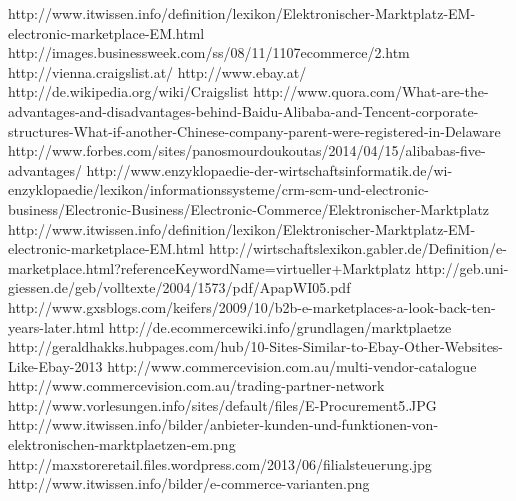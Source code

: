 \documentclass[11pt,a4paper]{article}
\begin{document}
\newpage
\begin{thebibliography}{1}
	
	 http://www.itwissen.info/definition/lexikon/Elektronischer-Marktplatz-EM-electronic-marketplace-EM.html
	 http://images.businessweek.com/ss/08/11/1107\textunderscore ecommerce/2.htm
	 http://vienna.craigslist.at/
	 http://www.ebay.at/
	 http://de.wikipedia.org/wiki/Craigslist
	 http://www.quora.com/What-are-the-advantages-and-disadvantages-behind-Baidu-Alibaba-and-Tencent-corporate-structures-What-if-another-Chinese-company-parent-were-registered-in-Delaware
	 http://www.forbes.com/sites/panosmourdoukoutas/2014/04/15/alibabas-five-advantages/
	 http://www.enzyklopaedie-der-wirtschaftsinformatik.de/wi-enzyklopaedie/lexikon/informationssysteme/crm-scm-und-electronic-business/Electronic-Business/Electronic-Commerce/Elektronischer-Marktplatz
	 http://www.itwissen.info/definition/lexikon/Elektronischer-Marktplatz-EM-electronic-marketplace-EM.html
	 http://wirtschaftslexikon.gabler.de/Definition/e-marketplace.html?referenceKeywordName=virtueller+Marktplatz
	 http://geb.uni-giessen.de/geb/volltexte/2004/1573/pdf/Apap\textunderscore WI\textunderscore 05.pdf
	 http://www.gxsblogs.com/keifers/2009/10/b2b-e-marketplaces-a-look-back-ten-years-later.html
	 http://de.ecommercewiki.info/grundlagen/marktplaetze
	 http://geraldhakks.hubpages.com/hub/10-Sites-Similar-to-Ebay-Other-Websites-Like-Ebay-2013
	 http://www.commercevision.com.au/multi-vendor-catalogue
	 http://www.commercevision.com.au/trading-partner-network
	 http://www.vorlesungen.info/sites/default/files/E-Procurement5.JPG
	http://www.itwissen.info/bilder/anbieter-kunden-und-funktionen-von-elektronischen-marktplaetzen-em.png
	 http://maxstoreretail.files.wordpress.com/2013/06/filialsteuerung.jpg
	 http://www.itwissen.info/bilder/e-commerce-varianten.png
\end{thebibliography}
\end{document}
